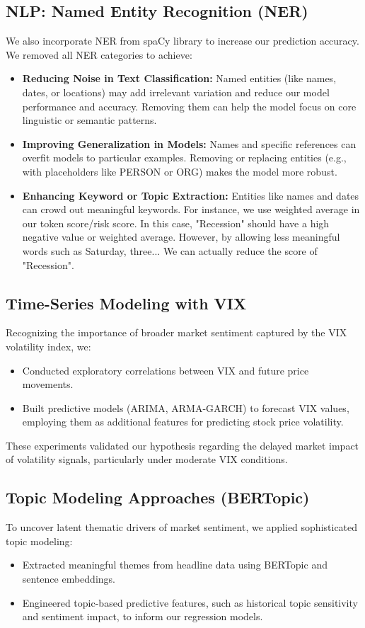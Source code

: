 \documentclass[twocolumn]{article}
\begin{document}
\subsection{NLP: Named Entity Recognition (NER)}
We also incorporate NER from spaCy library to increase our prediction accuracy. We removed all NER categories to achieve: 
\begin{itemize}
    \item \textbf{Reducing Noise in Text Classification:} Named entities (like names, dates, or locations) may add irrelevant variation and reduce our model performance and accuracy. Removing them can help the model focus on core linguistic or semantic patterns.
    \item \textbf{Improving Generalization in Models:} Names and specific references can overfit models to particular examples. Removing or replacing entities (e.g., with placeholders like PERSON or ORG) makes the model more robust.
    \item \textbf{Enhancing Keyword or Topic Extraction:} Entities like names and dates can crowd out meaningful keywords. For instance, we use weighted average in our token score/risk score. In this case, "Recession" should have a high negative value or weighted average. However, by allowing less meaningful words such as Saturday, three... We can actually reduce the score of "Recession".
\end{itemize}

\subsection{Time-Series Modeling with VIX}
Recognizing the importance of broader market sentiment captured by the VIX volatility index, we:
\begin{itemize}
    \item Conducted exploratory correlations between VIX and future price movements.
    \item Built predictive models (ARIMA, ARMA-GARCH) to forecast VIX values, employing them as additional features for predicting stock price volatility.
\end{itemize}

These experiments validated our hypothesis regarding the delayed market impact of volatility signals, particularly under moderate VIX conditions.

\subsection{Topic Modeling Approaches (BERTopic)}
To uncover latent thematic drivers of market sentiment, we applied sophisticated topic modeling:
\begin{itemize}
    \item Extracted meaningful themes from headline data using BERTopic and sentence embeddings.
    \item Engineered topic-based predictive features, such as historical topic sensitivity and sentiment impact, to inform our regression models.
\end{itemize}
\end{document}
